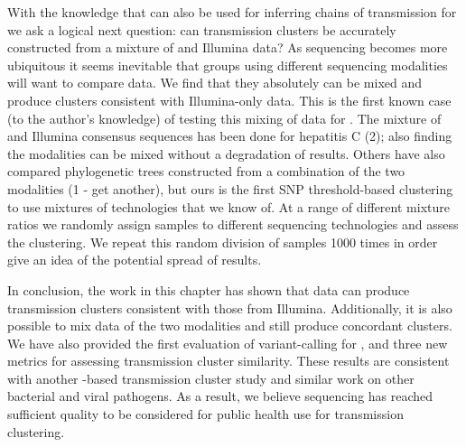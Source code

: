 With the knowledge that \ont{} can also be used for inferring chains of transmission for \mtb{} we ask a logical next question: can transmission clusters be accurately constructed from a mixture of \ont{} and Illumina data? As \ont{} sequencing becomes more ubiquitous it seems inevitable that groups using different sequencing modalities will want to compare data. We find that they absolutely can be mixed and produce clusters consistent with Illumina-only data. This is the first known case (to the author's knowledge) of testing this mixing of data for \mtb{}. The mixture of \ont{} and Illumina consensus sequences has been done for hepatitis C (2); also finding the modalities can be mixed without a degradation of results. Others have also compared phylogenetic trees constructed from a combination of the two modalities (1 - get another), but ours is the first SNP threshold-based clustering to use mixtures of technologies that we know of. 
At a range of different mixture ratios we randomly assign samples to different sequencing technologies and assess the clustering. We repeat this random division of samples 1000 times in order give an idea of the potential spread of results. 




In conclusion, the work in this chapter has shown that \ont{} data can produce transmission clusters consistent with those from Illumina. Additionally, it is also possible to mix data of the two modalities and still produce concordant clusters. We have also provided the first evaluation of \ont{} variant-calling for \mtb{}, and three new metrics for assessing transmission cluster similarity.
These results are consistent with another \mtb{} \ont{}-based transmission cluster study and similar work on other bacterial and viral pathogens. As a result, we believe \ont{} sequencing has reached sufficient quality to be considered for public health use for transmission clustering.


